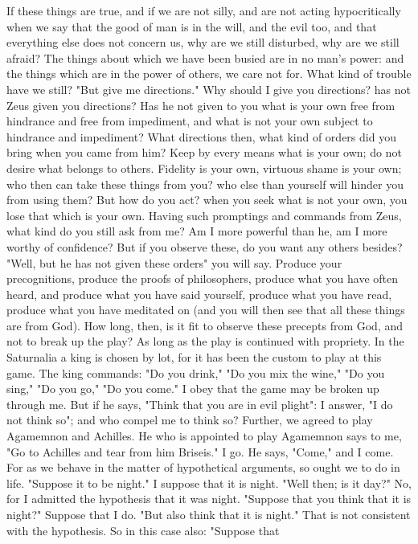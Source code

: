 \documentclass[a4paper]{article}
\begin{document}
    If these things are true, and if we are not silly, and are not acting
hypocritically when we say that the good of man is in the will, and the evil
too, and that everything else does not concern us, why are we still disturbed,
why are we still afraid? The things about which we have been busied are in no
man's power: and the things which are in the power of others, we care not for.
What kind of trouble have we still?
    "But give me directions." Why should I give you directions? has not Zeus
given you directions? Has he not given to you what is your own free from
hindrance and free from impediment, and what is not your own subject to
hindrance and impediment? What directions then, what kind of orders did you
bring when you came from him? Keep by every means what is your own; do not
desire what belongs to others. Fidelity is your own, virtuous shame is your
own; who then can take these things from you? who else than yourself will
hinder you from using them? But how do you act? when you seek what is not your
own, you lose that which is your own. Having such promptings and commands from
Zeus, what kind do you still ask from me? Am I more powerful than he, am I more
worthy of confidence? But if you observe these, do you want any others besides?
"Well, but he has not given these orders" you will say. Produce your
precognitions, produce the proofs of philosophers, produce what you have often
heard, and produce what you have said yourself, produce what you have read,
produce what you have meditated on (and you will then see that all these things
are from God). How long, then, is it fit to observe these precepts from God,
and not to break up the play? As long as the play is continued with propriety.
In the Saturnalia a king is chosen by lot, for it has been the custom to play
at this game. The king commands: "Do you drink," "Do you mix the wine," "Do you
sing," "Do you go," "Do you come." I obey that the game may be broken up
through me. But if he says, "Think that you are in evil plight": I answer, "I
do not think so"; and who compel me to think so? Further, we agreed to play
Agamemnon and Achilles. He who is appointed to play Agamemnon says to me, "Go
to Achilles and tear from him Briseis." I go. He says, "Come," and I come.
    For as we behave in the matter of hypothetical arguments, so ought we to do
in life. "Suppose it to be night." I suppose that it is night. "Well then; is
it day?" No, for I admitted the hypothesis that it was night. "Suppose that you
think that it is night?" Suppose that I do. "But also think that it is night."
That is not consistent with the hypothesis. So in this case also: "Suppose that
\end{document}
